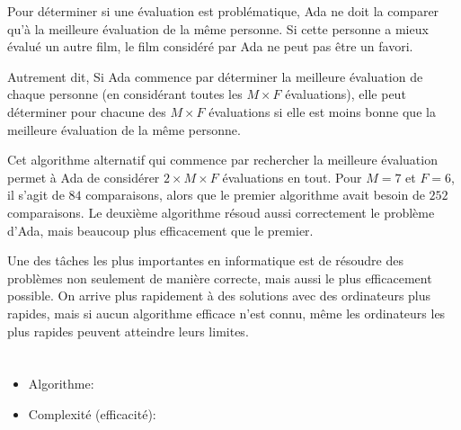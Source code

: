 {{Pour déterminer si une évaluation est problématique, Ada ne doit la comparer qu’à la meilleure évaluation de la même personne. Si cette personne a mieux évalué un autre film, le film considéré par Ada ne peut pas être un favori.

Autrement dit, Si Ada commence par déterminer la meilleure évaluation de chaque personne (en considérant toutes les ${M \times F}$ évaluations), elle peut déterminer pour chacune des ${M \times F}$ évaluations si elle est moins bonne que la meilleure évaluation de la même personne.

Cet algorithme alternatif qui commence par rechercher la meilleure évaluation permet à Ada de considérer ${2 \times M \times F}$ évaluations en tout. Pour ${M=7}$ et ${F=6}$, il s’agit de $84$ comparaisons, alors que le premier algorithme avait besoin de $252$ comparaisons. Le deuxième algorithme résoud aussi correctement le problème d’Ada, mais beaucoup plus efficacement que le premier.

Une des tâches les plus importantes en informatique est de résoudre des problèmes non seulement de manière correcte, mais aussi le plus efficacement possible. On arrive plus rapidement à des solutions avec des ordinateurs plus rapides, mais si aucun algorithme efficace n’est connu, même les ordinateurs les plus rapides peuvent atteindre leurs limites.



\section*{\BrochureWebsitesAndKeywords}
{\raggedright
\begin{itemize}
  \item Algorithme: \href{https://fr.wikipedia.org/wiki/Algorithme}{}
  \item Complexité (efficacité): \href{https://fr.wikipedia.org/wiki/Analyse_de_la_complexit\%C3\%A9_des_algorithmes}{}
\end{itemize}


}

}{}

\def\AuthorPohlW{} %
\def\AuthorSukovicG{} %
\def\AuthorPluharZ{} %
\def\AuthorSerafiniG{} %
\def\AuthorWeigendM{} %
\def\AuthorDatzkoS{} %
\def\AuthorPelletE{} %

\newpage}{}
